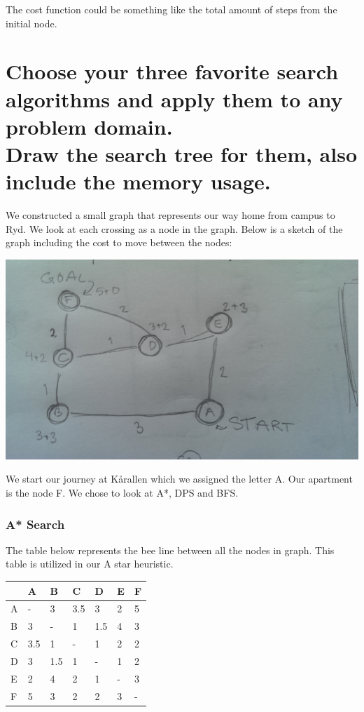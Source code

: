 \documentclass{article}
\begin{document}
The cost function could be something like the total amount of steps from the initial node.

\newpage

\section{Choose your three favorite search algorithms and apply them to any problem domain.\\Draw the search tree for them, also include the memory usage.}

We constructed a small graph that represents our way home from campus to Ryd. We look at each crossing as a node in the graph.
Below is a sketch of the graph including the cost to move between the nodes:

\includegraphics[scale=0.1]{graph}

We start our journey at Kårallen which we assigned the letter A. Our apartment is the node F. We chose to look at A*, DPS and BFS.

\subsubsection{A* Search}

The table below represents the bee line between all the nodes in graph. This table is utilized in our A star heuristic.

\begin{center}
	\begin{table}[h]
		\begin{tabular}{|l|l|l|l|l|l|l|}
			\hline
			   & A 		& B 	& C 	& D 	& E 	& F \\
			\hline
			A  & - 		& 3 	& 3.5	& 3 	& 2 	& 5 \\
			\hline
			B  & 3 		& - 	& 1 	& 1.5 	& 4 	& 3 \\
			\hline
			C  & 3.5	& 1 	& - 	& 1 	& 2 	& 2 \\
			\hline
			D  & 3 		& 1.5 	& 1 	& - 	& 1 	& 2 \\
			\hline
			E  & 2 		& 4 	& 2 	& 1 	& -	 	& 3 \\
			\hline
			F  & 5 		& 3 	& 2 	& 2 	& 3 	& - \\
			\hline
		\end{tabular}
	\end{table}
\end{center}
\end{document}
